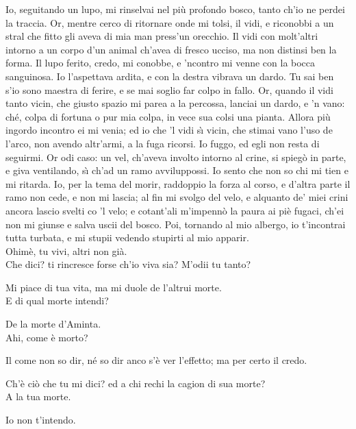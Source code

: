 \documentclass{book}
\begin{document}
   \3 Io, seguitando un lupo,
	mi rinselvai nel pi\`u profondo bosco,
	tanto ch'io ne perdei la traccia. Or, mentre
	cerco di ritornare onde mi tolsi,
	il vidi, e riconobbi a un stral che fitto
	gli aveva di mia man press'un orecchio.
	Il vidi con molt'altri intorno a un corpo
	d'un animal ch'avea di fresco ucciso,
	ma non distinsi ben la forma. Il lupo
	ferito, credo, mi conobbe, e 'ncontro
	mi venne con la bocca sanguinosa.
	Io l'aspettava ardita, e con la destra
	vibrava un dardo. Tu sai ben s'io sono
	maestra di ferire, e se mai soglio
	far colpo in fallo. Or, quando il vidi tanto
	vicin, che giusto spazio mi parea
	a la percossa, lanciai un dardo, e 'n vano:
	ch\'e, colpa di fortuna o pur mia colpa,
	in vece sua colsi una pianta. Allora
	pi\`u ingordo incontro ei mi venia; ed io
	che 'l vidi s\`{\i} vicin, che stimai vano
	l'uso de l'arco, non avendo altr'armi,
	a la fuga ricorsi. Io fuggo, ed egli
	non resta di seguirmi. Or odi caso:
	un vel, ch'aveva involto intorno al crine,
	si spieg\`o in parte, e giva ventilando,
	s\`{\i} ch'ad un ramo avviluppossi. Io sento
	che non so chi mi tien e mi ritarda.
	Io, per la tema del morir, raddoppio
	la forza al corso, e d'altra parte il ramo
	non cede, e non mi lascia; al fin mi svolgo
	del velo, e alquanto de' miei crini ancora
	lascio svelti co 'l velo; e cotant'ali
	m'impenn\`o la paura ai pi\`e fugaci,
	ch'ei non mi giunse e salva uscii del bosco.
	Poi, tornando al mio albergo, io t'incontrai
	tutta turbata, e mi stupii vedendo
	stupirti al mio apparir. \\

   \2 Ohim\`e, tu vivi,
	altri non gi\`a. \\

   \3 Che dici? ti rincresce
	forse ch'io viva sia? M'odii tu tanto?

	\2 Mi piace di tua vita, ma mi duole
	de l'altrui morte. \\

   \3 E di qual morte intendi?

	\2 De la morte d'Aminta. \\

   \3 Ahi, come \`e morto?

	\2 Il come non so dir, n\'e so dir anco
	s'\`e ver l'effetto; ma per certo il credo.

	\3 Ch'\`e ci\`o che tu mi dici? ed a chi rechi
	la cagion di sua morte? \\

   \2 A la tua morte.

	\3 Io non t'intendo. \\
\end{document}
